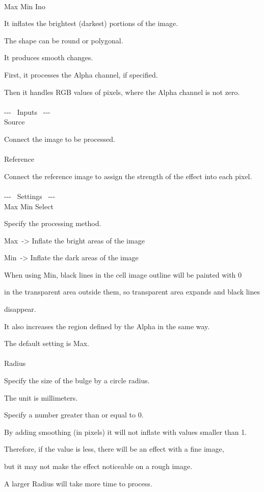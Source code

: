 \documentclass[a4paper,12pt]{article}
\begin{document}
\thispagestyle{empty}

\Large
\noindent \\
Max Min Ino\medskip
\par
\normalsize
It inflates the brightest (darkest) portions of the image.\\
\par
The shape can be round or polygonal.\par
It produces smooth changes.\\
\par
First, it processes the Alpha channel, if specified.\par
Then it handles RGB values of pixels, where the Alpha channel is not zero.\\
\\
-{-}- \ Inputs \ -{-}-\\
Source\par
Connect the image to be processed.\\
\\
Reference\par
Connect the reference image to assign the strength of the effect into each pixel.\\
\\
-{-}- \ Settings \ -{-}-\\
Max Min Select\par
Specify the processing method.\par
\textquotedbl Max\textquotedbl \ -> Inflate the bright areas of the image\par
\textquotedbl Min\textquotedbl \ -> Inflate the dark areas of the image\par
When using \textquotedbl Min\textquotedbl , black lines in the cell image outline will be painted with 0\par 
in the transparent area outside them, so transparent area expands and black lines\par 
disappear.\par
It also increases the region defined by the Alpha in the same way.\par
The default setting is \textquotedbl Max\textquotedbl .\\
\\
Radius\par
Specify the size of the bulge by a circle radius.\par
The unit is millimeters.\par
Specify a number greater than or equal to 0.\par
By adding smoothing (in pixels) it will not inflate with values smaller than 1.\par
Therefore, if the value is less, there will be an effect with a fine image,\par
but it may not make the effect noticeable on a rough image.\par
A larger Radius will take more time to process.\\
\end{document}
